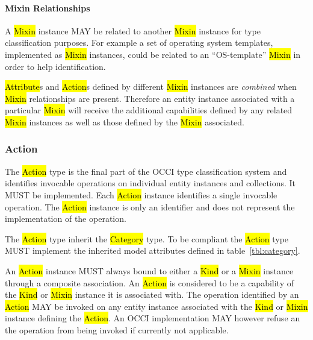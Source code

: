 \documentclass[10pt,a4paper]{article}
\begin{document}
\paragraph*{Mixin Relationships}

A \hl{Mixin} instance MAY be related to another \hl{Mixin} instance
for type classification purposes. For example a set of operating
system templates, implemented as \hl{Mixin} instances, could be
related to an ``OS-template'' \hl{Mixin} in order to help
identification.

\hl{Attribute}s and \hl{Action}s defined by different \hl{Mixin} instances
are {\em combined} when \hl{Mixin} relationships are present. Therefore an
entity instance associated with a particular \hl{Mixin} will receive
the additional capabilities defined by any related \hl{Mixin}
instances as well as those defined by the \hl{Mixin} associated.


\subsubsection{Action}
The \hl{Action} type is the final part of the OCCI type classification system
and identifies invocable operations on individual entity instances and collections.
It MUST be implemented.
Each \hl{Action} instance identifies a single invocable operation.
The \hl{Action} instance is only an identifier and does not represent the
implementation of the operation.

The \hl{Action} type inherit the \hl{Category} type. To be compliant
the \hl{Action} type MUST implement the inherited model attributes defined in
table~\ref{tbl:category}.


An \hl{Action} instance MUST always bound to either a \hl{Kind} or a \hl{Mixin}
instance through a composite association. An \hl{Action} is considered
to be a capability of the \hl{Kind} or \hl{Mixin} instance it is
associated with.  The operation identified by an \hl{Action} MAY be invoked on
any entity
instance associated with the \hl{Kind} or \hl{Mixin} instance defining
the \hl{Action}. An OCCI implementation MAY however refuse an
the operation from being invoked if currently not applicable.
\end{document}
